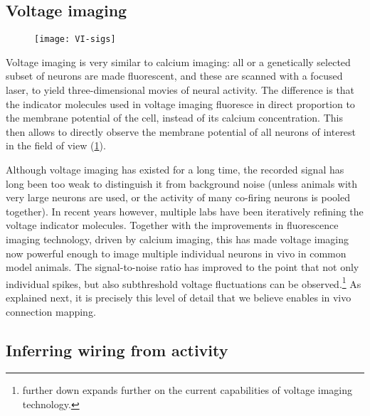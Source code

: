 \FloatBarrier
\subsection{Voltage imaging}

\begin{figure}
    \texttt{[image: VI-sigs]}
    \label{fig:VI-sigs}
\end{figure}

Voltage imaging is very similar to calcium imaging: all or a genetically selected subset of neurons are made fluorescent, and these are scanned with a focused laser, to yield three-dimensional movies of neural activity. The difference is that the indicator molecules used in voltage imaging fluoresce in direct proportion to the membrane potential of the cell, instead of its calcium concentration. This then allows to directly observe the membrane potential of all neurons of interest in the field of view (\cref{fig:VI-sigs}).

Although voltage imaging has existed for a long time, the recorded signal has long been too weak to distinguish it from background noise (unless animals with very large neurons are used, or the activity of many co-firing neurons is pooled together). In recent years however, multiple labs have been iteratively refining the voltage indicator molecules. Together with the improvements in fluorescence imaging technology, driven by calcium imaging, this has made voltage imaging now powerful enough to image multiple individual neurons in vivo in common model animals. The signal-to-noise ratio has improved to the point that not only individual spikes, but also subthreshold voltage fluctuations can be observed.\footnote{
     further down expands further on the current capabilities of voltage imaging technology.
}
As explained next, it is precisely this level of detail that we believe enables in vivo connection mapping.


\subsection{Inferring wiring from activity}

